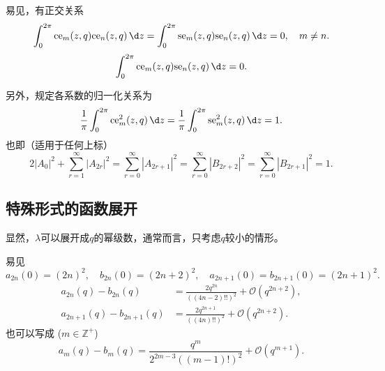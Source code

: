 易见，有正交关系
\begin{equation*}
	\int_{0}^{2\pi} \mathrm{ce}_m(z, q) \mathrm{ce}_n(z, q) \,\d z = \int_{0}^{2\pi} \mathrm{se}_m(z, q) \mathrm{se}_n(z, q) \,\d z = 0, \quad m \neq n.
\end{equation*}
\begin{equation*}
	\int_{0}^{2\pi} \mathrm{ce}_m(z, q) \mathrm{se}_n(z, q) \,\d z = 0.
\end{equation*}

另外，规定各系数的归一化关系为
\begin{equation*}
	\frac{1}{\pi} \int_{0}^{2\pi} \mathrm{ce}_m^2(z, q) \,\d z = \frac{1}{\pi} \int_{0}^{2\pi} \mathrm{se}_m^2(z, q) \,\d z = 1.
\end{equation*}
也即（适用于任何上标）
\begin{equation*}
	2|A_0|^2 + \sum_{r=1}^{\infty} |A_{2r}|^2 = \sum_{r=0}^{\infty} |A_{2r+1}|^2 = \sum_{r=0}^{\infty} |B_{2r+2}|^2 = \sum_{r=0}^{\infty} |B_{2r+1}|^2 = 1.
\end{equation*}

\subsection{特殊形式的函数展开}
显然，\(\lambda\)可以展开成\(q\)的幂级数，通常而言，只考虑\(q\)较小的情形。

易见
\begin{equation*}
	a_{2n}(0) = (2n)^2, \quad b_{2n}(0) = (2n + 2)^2, \quad a_{2n+1}(0) = b_{2n+1}(0) = (2n+1)^2.
\end{equation*}
\begin{align*}
	a_{2n}(q) - b_{2n}(q)     & = \frac{2q^{2n}}{((4n - 2)!!)^2} + \mathcal{O}(q^{2n+2}), \\
	a_{2n+1}(q) - b_{2n+1}(q) & = \frac{2q^{2n+1}}{((4n)!!)^2} + \mathcal{O}(q^{2n+2}).
\end{align*}
也可以写成 (\(m \in \mathbb{Z}^+\))
\begin{equation*}
	a_m(q) - b_m(q) = \frac{q^m}{2^{2m-3}((m - 1)!)^2} + \mathcal{O}(q^{m+1}).
\end{equation*}

